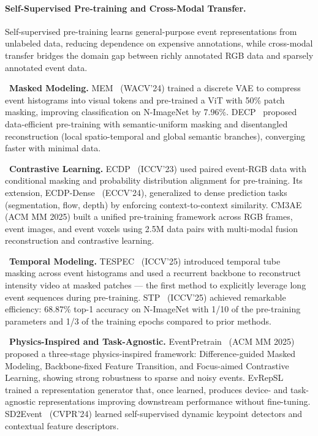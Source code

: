 \paragraph{Self-Supervised Pre-training and Cross-Modal Transfer.}
Self-supervised pre-training learns general-purpose event representations from unlabeled data, reducing dependence on expensive annotations, while cross-modal transfer bridges the domain gap between richly annotated RGB data and sparsely annotated event data.

\noindent{}~\textbf{Masked Modeling.} MEM~\cite{klenk2024mem} (WACV'24) trained a discrete VAE to compress event histograms into visual tokens and pre-trained a ViT with 50\% patch masking, improving classification on N-ImageNet by 7.96\%. DECP~\cite{chen2024decp} proposed data-efficient pre-training with semantic-uniform masking and disentangled reconstruction (local spatio-temporal and global semantic branches), converging faster with minimal data.

\noindent{}~\textbf{Contrastive Learning.} ECDP~\cite{yang2023ecdp} (ICCV'23) used paired event-RGB data with conditional masking and probability distribution alignment for pre-training. Its extension, ECDP-Dense~\cite{yang2024ecdpdense} (ECCV'24), generalized to dense prediction tasks (segmentation, flow, depth) by enforcing context-to-context similarity. CM3AE~\cite{wang2025cm3ae} (ACM MM 2025) built a unified pre-training framework across RGB frames, event images, and event voxels using 2.5M data pairs with multi-modal fusion reconstruction and contrastive learning.

\noindent{}~\textbf{Temporal Modeling.} TESPEC~\cite{liu2025tespec} (ICCV'25) introduced temporal tube masking across event histograms and used a recurrent backbone to reconstruct intensity video at masked patches --- the first method to explicitly leverage long event sequences during pre-training. STP~\cite{yang2025stp} (ICCV'25) achieved remarkable efficiency: 68.87\% top-1 accuracy on N-ImageNet with 1/10 of the pre-training parameters and 1/3 of the training epochs compared to prior methods.

\noindent{}~\textbf{Physics-Inspired and Task-Agnostic.} EventPretrain~\cite{wang2025eventpretrain} (ACM MM 2025) proposed a three-stage physics-inspired framework: Difference-guided Masked Modeling, Backbone-fixed Feature Transition, and Focus-aimed Contrastive Learning, showing strong robustness to sparse and noisy events. EvRepSL~\cite{kang2024evrepsl} trained a representation generator that, once learned, produces device- and task-agnostic representations improving downstream performance without fine-tuning. SD2Event~\cite{huang2024sd2event} (CVPR'24) learned self-supervised dynamic keypoint detectors and contextual feature descriptors.

